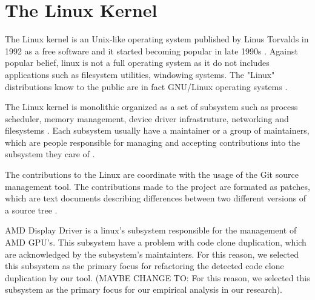 \en

\section{The Linux Kernel}

The Linux kernel is an Unix-like operating system published by Linus Torvalds in 1992 as a free software and
it started becoming popular in late 1990s \citep{linuxbook}. Against popular belief, linux is not a full 
operating system as it do not includes applications such as filesystem utilities, windowing systems. The "Linux" 
distributions know to the public are in fact GNU/Linux operating systems \citep{gnuref}.

The Linux kernel is monolithic organized as a set of subsystem such as process scheduler, memory management, 
device driver infrastruture, networking and filesystems \citep{melissa}.
Each subsystem usually have a maintainer or a group of maintainers, which are people responsible 
for managing and accepting contributions into the subsystem they care of \citep{melissa}. 

The contributions to the Linux are coordinate with the usage of the Git source management tool. The contributions 
made to the project are formated as patches, which are text documents describing differences between two different 
versions of a source tree \citep{melissa}.

AMD Display Driver is a linux's subsystem responsible for the management of AMD GPU's. This subsystem have a problem 
with code clone duplication, which are acknowledged by the subsystem's maintainters. For this reason, we selected this
subsystem as the primary focus for refactoring the detected code clone duplication by our tool.
(MAYBE CHANGE TO: For this reason, we selected this subsystem as the primary focus for our empirical analysis in our research).
